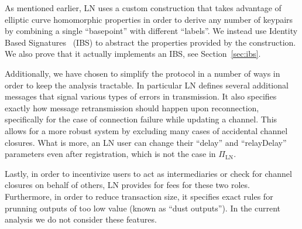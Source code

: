     As mentioned earlier, LN uses a custom construction that takes advantage of
    elliptic curve homomorphic properties in order to derive any number of
    keypairs by combining a single ``basepoint'' with different ``labels''. We
    instead use  Identity Based Signatures~\cite{ibsshamir,ibspaterson} (IBS)
    to abstract the properties provided by the construction.  We also prove that
    it actually implements an IBS, see Section~\ref{sec:ibs}.

    Additionally, we have chosen to simplify the protocol in a number of ways in
    order to keep the analysis tractable. In particular LN defines several
    additional messages that signal various types of errors in transmission. It
    also specifies exactly how message retransmission should happen upon
    reconnection, specifically for the case of connection failure while updating
    a channel. This allows for a more robust system by excluding many cases of
    accidental channel closures. What is more, an LN user can change their
    ``delay'' and ``relayDelay'' parameters even after registration, which is
    not the case in $\Pi_{\mathrm{LN}}$.

    Lastly, in order to incentivize users to act as intermediaries or check for
    channel closures on behalf of others, LN provides for fees for these two
    roles. Furthermore, in order to reduce transaction size, it specifies exact
    rules for prunning outputs of too low value (known as ``dust outputs''). In
    the current analysis we do not consider these features.
  \ifelseieee{}{\end{remark}}
